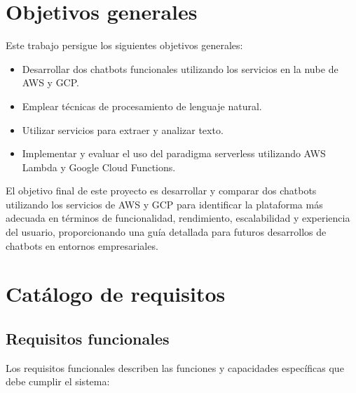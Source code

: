 \section{Objetivos generales}\label{sec:Objetivos generales}

Este trabajo persigue los siguientes objetivos generales:

\begin{itemize}
    \item Desarrollar dos chatbots funcionales utilizando los servicios en la nube de AWS y GCP.
    \item Emplear técnicas de procesamiento de lenguaje natural.
    \item Utilizar servicios para extraer y analizar texto.
    \item Implementar y evaluar el uso del paradigma serverless utilizando AWS Lambda y Google Cloud Functions.
\end{itemize}

El objetivo final de este proyecto es desarrollar y comparar dos chatbots utilizando los servicios de AWS y GCP para identificar la plataforma más adecuada en términos de funcionalidad, rendimiento, escalabilidad y experiencia del usuario, proporcionando una guía detallada para futuros desarrollos de chatbots en entornos empresariales.

\section{Catálogo de requisitos}\label{sec:Catálogo de requisitos}

\subsection{Requisitos funcionales}

Los requisitos funcionales describen las funciones y capacidades específicas que debe cumplir el sistema:

